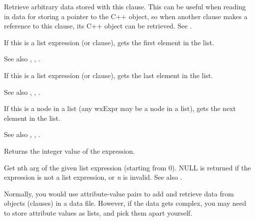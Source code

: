
Retrieve arbitrary data stored with this clause. This can be useful when
reading in data for storing a pointer to the C++ object, so when another
clause makes a reference to this clause, its C++ object can be retrieved.
See .

\label{wxexprgetfirst}


If this is a list expression (or clause), gets the first element in the list.

See also , , .

\label{wxexprgetlast}


If this is a list expression (or clause), gets the last element in the list.

See also , , .

\label{wxexprgetnext}


If this is a node in a list (any wxExpr may be a node in a list), gets the
next element in the list.

See also , , .

\label{wxexprintegervalue}


Returns the integer value of the expression.

\label{wxexprnth}


Get nth arg of the given list expression (starting from 0). NULL is returned if
the expression is not a list expression, or {\it n} is invalid. See also .

Normally, you would use attribute-value pairs to add and retrieve data
from objects (clauses) in a data file. However, if the data gets complex,
you may need to store attribute values as lists, and pick them apart
yourself.


